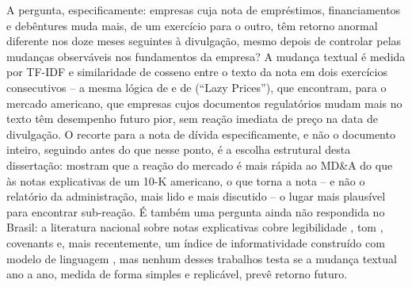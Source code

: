 \documentclass[a4paper,12pt]{report}
\begin{document}
A pergunta, especificamente: empresas cuja nota de empréstimos, financiamentos e debêntures muda mais, de um exercício para o outro, têm retorno anormal diferente nos doze meses seguintes à divulgação, mesmo depois de controlar pelas mudanças observáveis nos fundamentos da empresa? A mudança textual é medida por TF-IDF e similaridade de cosseno entre o texto da nota em dois exercícios consecutivos -- a mesma lógica de  e de  (``Lazy Prices''), que encontram, para o mercado americano, que empresas cujos documentos regulatórios mudam mais no texto têm desempenho futuro pior, sem reação imediata de preço na data de divulgação. O recorte para a nota de dívida especificamente, e não o documento inteiro, seguindo antes  do que  nesse ponto, é a escolha estrutural desta dissertação:  mostram que a reação do mercado é mais rápida ao MD\&A do que às notas explicativas de um 10-K americano, o que torna a nota -- e não o relatório da administração, mais lido e mais discutido -- o lugar mais plausível para encontrar sub-reação. É também uma pergunta ainda não respondida no Brasil: a literatura nacional sobre notas explicativas cobre legibilidade \cite{borges,silva2019}, tom \cite{muniz2025}, covenants \cite{schiozer2021} e, mais recentemente, um índice de informatividade construído com modelo de linguagem \cite{costaneto2025}, mas nenhum desses trabalhos testa se a mudança textual ano a ano, medida de forma simples e replicável, prevê retorno futuro.
\end{document}
